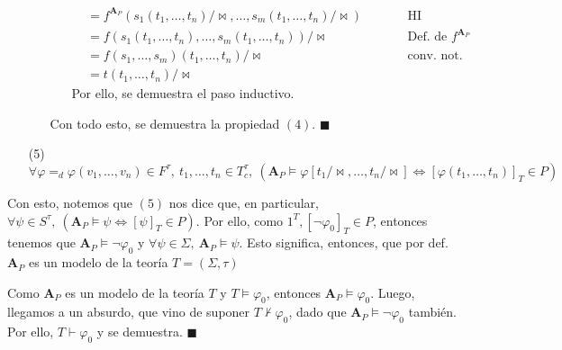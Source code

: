 \documentclass{article}
\begin{document}
\begin{enumerate}
\begin{itemize}
\begin{itemize}
\begin{equation*}
\begin{alignedat}{2}
                                                                                & =f^{\mathbf{A}_P}(s_1(t_1,\dots,t_n)/\!\bowtie,\dots,s_m(t_1,\dots,t_n)/\!\bowtie)                                                   &  & \qquad\text{HI}                       \\
                                                                                & =f(s_1(t_1,\dots,t_n),\dots,s_m(t_1,\dots,t_n))/\!\bowtie                                                                            &  & \qquad\text{Def. de }f^{\mathbf{A}_P} \\
                                                                                & =f(s_1,\dots,s_m)(t_1,\dots,t_n)/\!\bowtie                                                                                           &  & \qquad\text{conv. not.}               \\
                                                                                & =t(t_1,\dots,t_n)/\!\bowtie
                          \end{alignedat}
                        \end{equation*}
                        Por ello, se demuestra el paso inductivo.
                \end{itemize}
                Con todo esto, se demuestra la propiedad $(4)$. $\blacksquare$
        \end{itemize}
  \item[(5)] $\forall\varphi=_d\varphi(v_1,\dots,v_n)\in F^\tau,\ t_1,\dots,t_n\in T^\tau_c,\ (\mathbf{A}_P\vDash\varphi[t_1/\!\bowtie,\dots,t_n/\!\bowtie]\iff[\varphi(t_1,\dots,t_n)]_T\in P)$
\end{enumerate}

Con esto, notemos que $(5)$ nos dice que, en particular, $\forall\psi\in S^\tau,\ (\mathbf{A}_P\vDash\psi\iff[\psi]_T\in P)$. Por ello, como $1^T, [\neg\varphi_0]_T\in P$, entonces tenemos que $\mathbf{A}_P\vDash \neg\varphi_0$ y $\forall\psi\in\Sigma,\ \mathbf{A}_P\vDash\psi$. Esto significa, entonces, que por def. $\mathbf{A}_P$ es un modelo de la teoría $T=(\Sigma,\tau)$

Como $\mathbf{A}_P$ es un modelo de la teoría $T$ y $T\vDash\varphi_0$, entonces $\mathbf{A}_P\vDash\varphi_0$. Luego, llegamos a un absurdo, que vino de suponer $T\nvdash\varphi_0$, dado que $\mathbf{A}_P\vDash\neg\varphi_0$ también. Por ello, $T\vdash\varphi_0$ y se demuestra. $\blacksquare$
\end{document}
